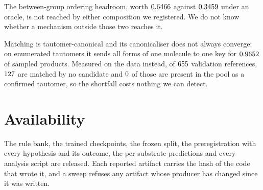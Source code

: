 \documentclass[11pt]{article}
\begin{document}
The between-group ordering headroom, worth $0.6466$ against $0.3459$ under
an oracle, is not reached by either composition we registered. We do not know whether a mechanism
outside those two reaches it.

Matching is tautomer-canonical and its canonicaliser does not always converge: on enumerated
tautomers it sends all forms of one molecule to one key for $0.9652$ of sampled
products. Measured on the data instead, of $655$ validation references,
$127$ are matched by no candidate and $0$ of those are
present in the pool as a confirmed tautomer, so the shortfall costs nothing we can detect.

\section{Availability}

The rule bank, the trained checkpoints, the frozen split, the preregistration with every
hypothesis and its outcome, the per-substrate predictions and every analysis script are released.
Each reported artifact carries the hash of the code that wrote it, and a sweep refuses any artifact
whose producer has changed since it was written.



\end{document}

